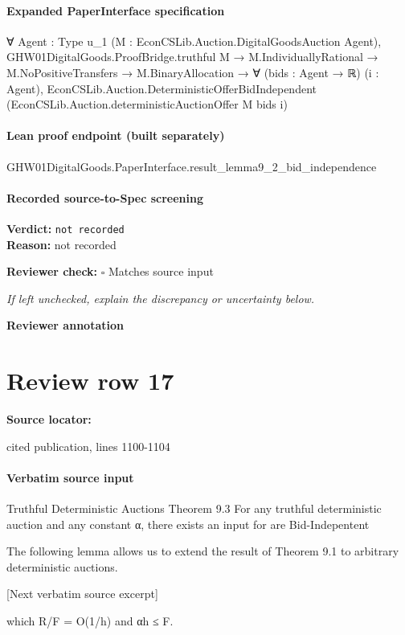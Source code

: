 \documentclass[10pt]{article}
\newcommand{\reviewerbox}{%
  \par\noindent\fbox{\parbox{0.96\linewidth}{\rule{0pt}{0.38in}}}\par
}
\newcommand{\reviewmatch}[1]{%
  \par\noindent\textbf{Reviewer check:} $\square$\; #1\par
  \noindent\emph{If left unchecked, explain the discrepancy or uncertainty below.}\par
}
\begin{document}
\paragraph{Expanded PaperInterface specification}
\begin{ReviewVerbatim}
∀ {Agent : Type u_1} (M : EconCSLib.Auction.DigitalGoodsAuction Agent),
  GHW01DigitalGoods.ProofBridge.truthful M →
    M.IndividuallyRational →
      M.NoPositiveTransfers →
        M.BinaryAllocation →
          ∀ (bids : Agent → ℝ) (i : Agent),
            EconCSLib.Auction.DeterministicOfferBidIndependent (EconCSLib.Auction.deterministicAuctionOffer M bids i)
\end{ReviewVerbatim}

\paragraph{Lean proof endpoint (built separately)}\begin{ReviewVerbatim}
GHW01DigitalGoods.PaperInterface.result_lemma9_2_bid_independence
\end{ReviewVerbatim}

\paragraph{Recorded source-to-Spec screening}
\textbf{Verdict:} \texttt{not recorded}
\\
\textbf{Reason:} not recorded
\reviewmatch{Matches source input}
\noindent\textbf{Reviewer annotation}\par
\reviewerbox
\clearpage
\hypertarget{source-claim-6ef8d3c17f2b5df3}{}
\section*{Review row 17}
\textbf{Source locator:} {\footnotesize\raggedright cited publication, lines 1100-\allowbreak{}1104\par}
\paragraph{Verbatim source input}
\begin{ReviewVerbatim}
Truthful Deterministic Auctions Theorem 9.3 For any truthful deterministic auction and any constant α, there exists an input for
are Bid-Indepentent

The following lemma allows us to extend the result
of Theorem 9.1 to arbitrary deterministic auctions.

[Next verbatim source excerpt]

which R/F = O(1/h) and αh ≤ F.
\end{ReviewVerbatim}
\end{document}
